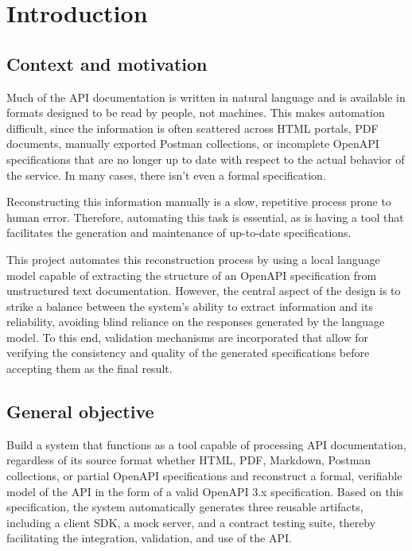 \chapter{Introduction}

\section{Context and motivation}

Much of the API documentation is written 
in natural language and is available in formats designed 
to be read by people, not machines. 
This makes automation difficult, since the information 
is often scattered across HTML portals, PDF documents, 
manually exported Postman collections, or incomplete 
OpenAPI specifications that are no longer up to date with respect to the 
actual behavior of the service. In many cases, 
there isn’t even a formal specification.

Reconstructing this information manually is a slow, 
repetitive process prone to human error. Therefore, 
automating this task is essential, as is 
having a tool that facilitates the generation and 
maintenance of up-to-date specifications.

This project automates this reconstruction process 
by using a local language model capable of 
extracting the structure of an OpenAPI specification 
from unstructured text documentation. However, 
the central aspect of the design is to strike a 
balance between the system’s ability to extract information 
and its reliability, avoiding blind reliance 
on the responses generated by the language model. 
To this end, validation mechanisms are incorporated that 
allow for verifying the consistency and quality of the 
generated specifications before accepting them 
as the final result.


\section{General objective}

Build a system that functions as a tool capable 
of processing API documentation, regardless of 
its source format whether HTML, PDF, Markdown, 
Postman collections, or partial OpenAPI specifications and reconstruct 
a formal, verifiable model of the API in the form of a 
valid OpenAPI 3.x specification. Based on this 
specification, the system automatically generates three 
reusable artifacts, including a client SDK, 
a mock server, and a contract testing suite, 
thereby facilitating the integration, validation, 
and use of the API.



